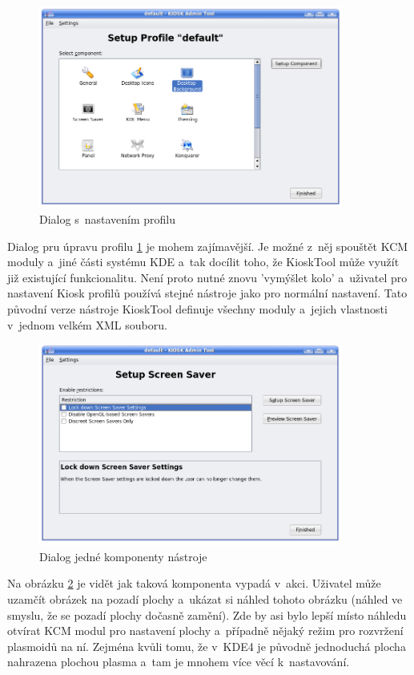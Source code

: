 \begin{figure}[h]
    \centering
    \includegraphics[width=10cm]{obrazky/KioskToolKDE3/seznam_komponent.png}
    \caption{Dialog s~nastavením profilu}
    \label{fig:kt3_nast_prof}
\end{figure}
Dialog pru úpravu profilu \ref{fig:kt3_nast_prof} je mohem zajímavější. Je možné z~něj spouštět KCM moduly a~jiné části systému KDE a~tak docílit toho, že KioskTool může využít již existující funkcionalitu. Není proto nutné znovu 'vymýšlet kolo' a~uživatel pro nastavení Kiosk profilů používá stejné nástroje jako pro normální nastavení. Tato původní verze nástroje KioskTool definuje všechny moduly a~jejich vlastnosti v~jednom velkém XML souboru.

\begin{figure}[h]
    \centering
    \includegraphics[width=10cm]{obrazky/KioskToolKDE3/ukazka_komponenty.png}
    \caption{Dialog jedné komponenty nástroje}
    \label{fig:kt3_nast_komp}
\end{figure}
Na obrázku \ref{fig:kt3_nast_komp} je vidět jak taková komponenta vypadá v~akci. Uživatel může uzamčít obrázek na pozadí plochy a~ukázat si náhled tohoto obrázku (náhled ve smyslu, že se pozadí plochy dočasně zamění). Zde by asi bylo lepší místo náhledu otvírat KCM modul pro nastavení plochy a~případně nějaký režim pro rozvržení plasmoidů  na ní. Zejména kvůli tomu, že v~KDE4 je původně jednoduchá plocha nahrazena plochou plasma a~tam je mnohem více věcí k~nastavování.

